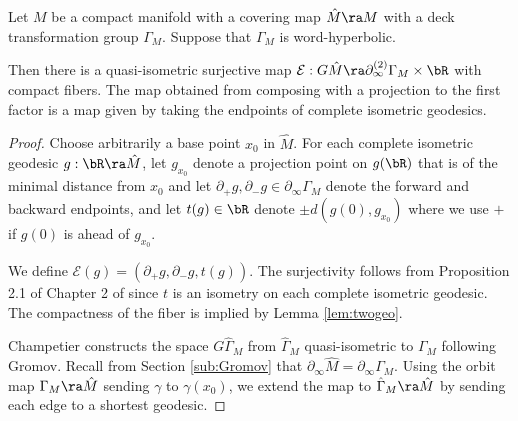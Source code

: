 \begin{proposition} \label{prop:Uc} 
	Let $M$ be a compact manifold with a covering map $\hat M \ra M$
	with a deck transformation group $\Gamma_M$. 
	Suppose that $\Gamma_M$ is word-hyperbolic.

	Then there is 
	a quasi-isometric surjective map 
	$\mathcal{E}: G\hat M \ra \partial^{(2)}_\infty \Gamma_M \times \bR$ with compact fibers. 
	The map obtained from composing with 
	a projection to the first factor is a map given by taking the endpoints of complete isometric geodesics. 
\end{proposition} 
\begin{proof} 
	Choose arbitrarily a base point $x_0$ in $\hat M$. 
	For each complete isometric geodesic $g: \bR \ra \hat M$, 
	let $g_{x_0}$ denote a projection point on $g(\bR)$ that is of 
	the minimal distance from $x_0$
	and let $\partial_+ g, \partial_-g \in \partial_\infty \Gamma_M$ denote
	the forward and backward endpoints,  
	and let $t(g) \in \bR$ denote $\pm d(g(0), g_{x_0})$ where we use $+$ 
	if $g(0)$ is ahead of $g_{x_0}$.  
	
	We define 
	$\mathcal{E}(g) = (\partial_+ g, \partial_- g, t(g))$. 
	The surjectivity follows from Proposition 2.1 of Chapter 2 of 
	\cite{CDP90} since $t$ is an isometry on each complete isometric  
	geodesic. 	The compactness of the fiber is implied by Lemma \ref{lem:twogeo}. 
	
	
	
	
	Champetier \cite{Champetier94} constructs the space 
	$G\hat{\Gamma}_M$ from $\hat{\Gamma}_M$ quasi-isometric to $\Gamma_M$ 
	following Gromov. 
Recall from Section \ref{sub:Gromov} that $\partial_\infty \hat{M} = \partial_\infty \Gamma_M$. Using the orbit map $\Gamma_M \ra \hat{M}$ sending $\gamma$ to $\gamma(x_0)$, we extend the map to $\hat{\Gamma}_M \ra \hat{M}$ by sending each edge to a shortest geodesic.


\end{proof}
